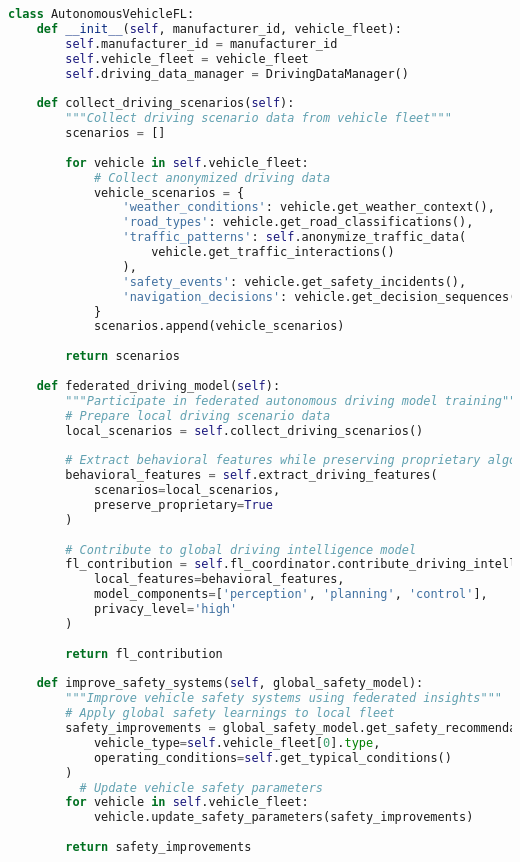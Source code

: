 \begin{lstlisting}[language=python, caption=Autonomous Vehicle FL Implementation]
class AutonomousVehicleFL:
    def __init__(self, manufacturer_id, vehicle_fleet):
        self.manufacturer_id = manufacturer_id
        self.vehicle_fleet = vehicle_fleet
        self.driving_data_manager = DrivingDataManager()
        
    def collect_driving_scenarios(self):
        """Collect driving scenario data from vehicle fleet"""
        scenarios = []
        
        for vehicle in self.vehicle_fleet:
            # Collect anonymized driving data
            vehicle_scenarios = {
                'weather_conditions': vehicle.get_weather_context(),
                'road_types': vehicle.get_road_classifications(),
                'traffic_patterns': self.anonymize_traffic_data(
                    vehicle.get_traffic_interactions()
                ),
                'safety_events': vehicle.get_safety_incidents(),
                'navigation_decisions': vehicle.get_decision_sequences()
            }
            scenarios.append(vehicle_scenarios)
            
        return scenarios
        
    def federated_driving_model(self):
        """Participate in federated autonomous driving model training"""
        # Prepare local driving scenario data
        local_scenarios = self.collect_driving_scenarios()
        
        # Extract behavioral features while preserving proprietary algorithms
        behavioral_features = self.extract_driving_features(
            scenarios=local_scenarios,
            preserve_proprietary=True
        )
        
        # Contribute to global driving intelligence model
        fl_contribution = self.fl_coordinator.contribute_driving_intelligence(
            local_features=behavioral_features,
            model_components=['perception', 'planning', 'control'],
            privacy_level='high'
        )
        
        return fl_contribution
        
    def improve_safety_systems(self, global_safety_model):
        """Improve vehicle safety systems using federated insights"""
        # Apply global safety learnings to local fleet
        safety_improvements = global_safety_model.get_safety_recommendations(
            vehicle_type=self.vehicle_fleet[0].type,
            operating_conditions=self.get_typical_conditions()
        )
          # Update vehicle safety parameters
        for vehicle in self.vehicle_fleet:
            vehicle.update_safety_parameters(safety_improvements)
            
        return safety_improvements
\end{lstlisting}

